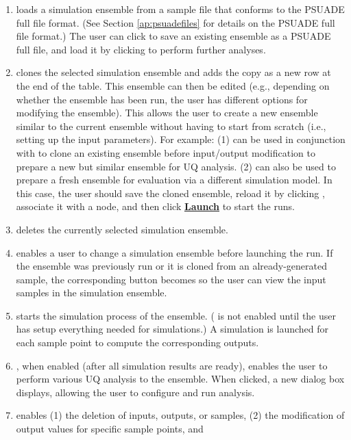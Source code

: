 \begin{enumerate}
\item
	 loads a simulation ensemble from a sample file
 	that conforms to the PSUADE full file format. (See
 	Section \ref{ap:psuadefiles} for details on the PSUADE full file format.)
   The user can click  to save an existing ensemble as a
 	PSUADE full file, and load it by clicking  to perform
 	further analyses. 
\item
	 clones the selected simulation ensemble and adds the
	copy as a new row at the end of the table. This ensemble can then be
	edited (e.g., depending on whether the ensemble has been run, the user
	has different options for modifying the ensemble). 
   This allows the user to create a new ensemble similar to
	the current ensemble without having to start from scratch (i.e., setting
	up the input parameters). For example: (1)  can be used in
	conjunction with  to clone an existing ensemble
	before input/output modification to prepare a new but similar
	ensemble for UQ analysis. (2)  can also be used to
	prepare a fresh ensemble for evaluation via a different simulation
	model. In this case, the user should save the cloned ensemble,
	reload it by clicking , associate it with a node, and then
	click \textbf{\underline{Launch}} to start the runs. 
\item
	 deletes the currently selected simulation ensemble.
\item
	 enables a user to change a simulation ensemble before launching
	the run. If the ensemble was previously run or it is cloned from an
	already-generated sample, the corresponding button becomes  so
	the user can view the input samples in the simulation ensemble. 
\item
	 starts the simulation process of the ensemble. (
	is not enabled until the user has setup everything needed for
	simulations.) A simulation is launched for each sample point to compute
	the corresponding outputs.
\item
	, when enabled (after all simulation results are ready),
   enables the user to perform various UQ analysis to the ensemble.  When
   clicked, a new dialog box displays, allowing the user to configure and
   run analysis.
\item
	 enables (1) the deletion of inputs, outputs, or samples, 
	(2) the	modification of output values for specific sample points, and 

\end{enumerate}

